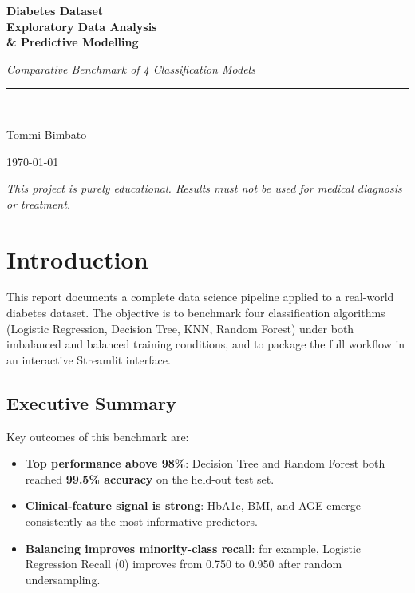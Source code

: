 \documentclass[12pt, a4paper]{article}
\begin{document}
\begin{titlepage}
    \centering
    \vspace*{2cm}
    {\Huge\bfseries\color{accent} Diabetes Dataset\\[0.4em]
     Exploratory Data Analysis\\[0.4em]
     \& Predictive Modelling\par}
    \vspace{1.5cm}
      {\large\itshape Comparative Benchmark of 4 Classification Models\par}
    \vspace{0.5cm}

    \vspace{2cm}
    \rule{0.5\textwidth}{0.4pt}\\[0.5cm]
    {\Large Tommi Bimbato\par}
    \vspace{0.5cm}
    {\normalsize\today\par}
    \vfill
    \small\textit{This project is purely educational. Results must not be used
    for medical diagnosis or treatment.}
\end{titlepage}

\tableofcontents
\newpage

\section{Introduction}

This report documents a complete data science pipeline applied to a real-world
diabetes dataset. The objective is to benchmark four classification algorithms
(Logistic Regression, Decision Tree, KNN, Random Forest) under both imbalanced
and balanced training conditions, and to package the full workflow in an
interactive Streamlit interface.

\subsection{Executive Summary}

Key outcomes of this benchmark are:
\begin{itemize}
    \item \textbf{Top performance above 98\%}: Decision Tree and Random Forest
          both reached \textbf{99.5\% accuracy} on the held-out test set.
    \item \textbf{Clinical-feature signal is strong}: HbA1c, BMI, and AGE
          emerge consistently as the most informative predictors.
    \item \textbf{Balancing improves minority-class recall}: for example,
          Logistic Regression Recall (0) improves from 0.750 to 0.950 after
          random undersampling.
\end{itemize}
\end{document}
